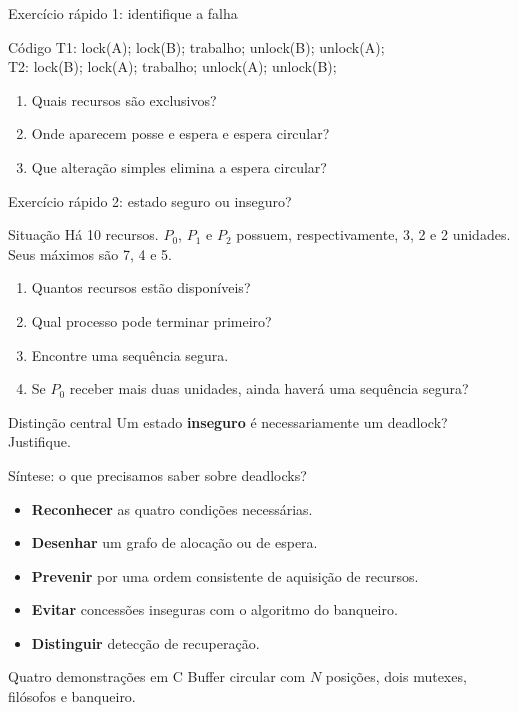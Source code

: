 \documentclass[aspectratio=169,11pt]{beamer}
\begin{document}
\begin{frame}{Exercício rápido 1: identifique a falha}
\small
\begin{block}{Código}
\ttfamily
T1: lock(A); lock(B); trabalho; unlock(B); unlock(A);\\[.25cm]
T2: lock(B); lock(A); trabalho; unlock(A); unlock(B);
\end{block}
\vspace{.4cm}
\begin{enumerate}
\item Quais recursos são exclusivos?
\item Onde aparecem posse e espera e espera circular?
\item Que alteração simples elimina a espera circular?
\end{enumerate}
\end{frame}

\begin{frame}{Exercício rápido 2: estado seguro ou inseguro?}
\small
\begin{block}{Situação}
Há 10 recursos. $P_0$, $P_1$ e $P_2$ possuem, respectivamente, 3, 2 e 2 unidades. Seus máximos são 7, 4 e 5.
\end{block}
\begin{enumerate}
\setlength\itemsep{.5em}
\item Quantos recursos estão disponíveis?
\item Qual processo pode terminar primeiro?
\item Encontre uma sequência segura.
\item Se $P_0$ receber mais duas unidades, ainda haverá uma sequência segura?
\end{enumerate}
\begin{alertblock}{Distinção central}
Um estado \textbf{inseguro} é necessariamente um deadlock? Justifique.
\end{alertblock}
\end{frame}

\begin{frame}{Síntese: o que precisamos saber sobre deadlocks?}
\small
\begin{itemize}
\setlength\itemsep{.65em}
\item \textbf{Reconhecer} as quatro condições necessárias.
\item \textbf{Desenhar} um grafo de alocação ou de espera.
\item \textbf{Prevenir} por uma ordem consistente de aquisição de recursos.
\item \textbf{Evitar} concessões inseguras com o algoritmo do banqueiro.
\item \textbf{Distinguir} detecção de recuperação.
\end{itemize}
\begin{block}{Quatro demonstrações em C}
Buffer circular com $N$ posições, dois mutexes, filósofos e banqueiro.
\end{block}
\end{frame}
\end{document}
